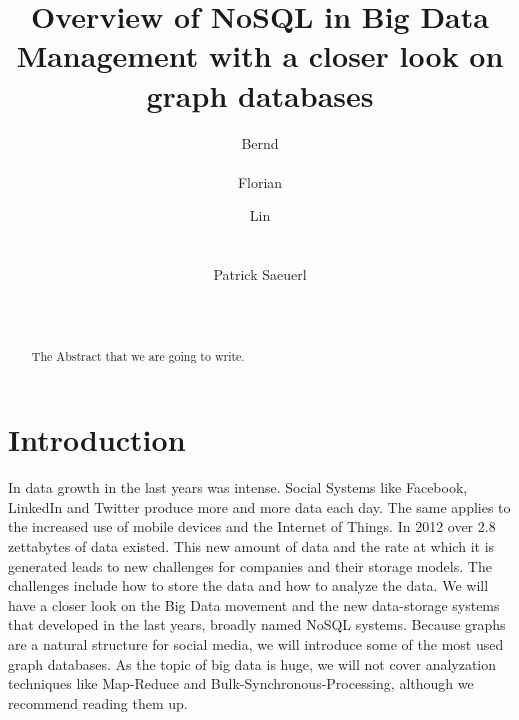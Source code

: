 \documentclass{acm_proc_article-sp}
\begin{document}
\title{Overview of NoSQL in Big Data Management with a closer look on graph databases }

\author{
\alignauthor
Bernd\\
       \\
\alignauthor Florian
       \\
\and
\alignauthor Lin
       \\
       \\
       \\
\alignauthor Patrick Saeuerl\\
       \\
	   \\
}


\maketitle
\begin{abstract}
The Abstract that we are going to write.
\end{abstract}

\section{Introduction}

In data growth in the last years was intense. Social Systems like Facebook, LinkedIn and Twitter produce more and more data each day. The same applies to the increased use of mobile devices and the Internet of Things. In 2012 over 2.8 zettabytes of data existed.
This new amount of data and the rate at which it is generated leads to new challenges for companies and their storage models. The challenges include how to store the data and how to analyze the data. We will have a closer look on the Big Data movement and the new data-storage systems that developed in the last years, broadly named NoSQL systems. Because graphs are a natural structure for social media, we will introduce some of the most used graph databases. As the topic of big data is huge, we will not cover analyzation techniques like Map-Reduce and Bulk-Synchronous-Processing, although we recommend reading them up.
\end{document}
